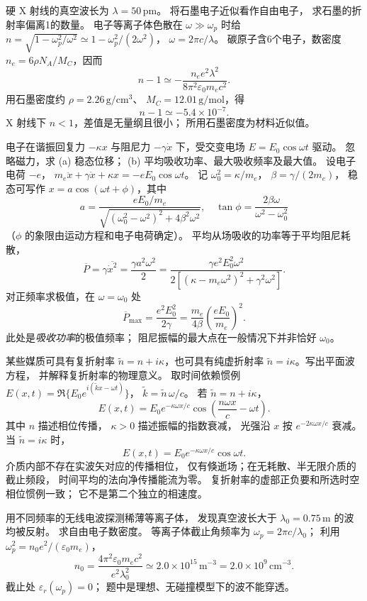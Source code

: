 硬 X 射线的真空波长为 $\lambda=50\,\mathrm{pm}$。
将石墨电子近似看作自由电子，
求石墨的折射率偏离1的数量。
\exsolution
电子等离子体色散在 $\omega\gg\omega_p$ 时给
$n=\sqrt{1-\omega_p^2/\omega^2}
\simeq1-\omega_p^2/(2\omega^2)$，
$\omega=2\pi c/\lambda$。
碳原子含6个电子，数密度
$n_e=6\rho N_A/M_C$，因而
\[
 \boxed{n-1\simeq-
 \frac{n_e e^2\lambda^2}{8\pi^2\varepsilon_0m_ec^2}}.
\]
用石墨密度约
$\rho=2.26\,\mathrm{g/cm^3}$、
$M_C=12.01\,\mathrm{g/mol}$，得
\[
 \boxed{n-1\simeq-5.4\times10^{-7}}.
\]
\excheck X 射线下 $n<1$，差值是无量纲且很小；
所用石墨密度为材料近似值。

电子在谐振回复力 $-\kappa x$ 与阻尼力
$-\gamma\dot x$ 下，受交变电场
$E=E_0\cos\omega t$ 驱动。
忽略磁力，求 (a) 稳态位移；
(b) 平均吸收功率、最大吸收频率及最大值。
\exsolution
设电子电荷 $-e$，
$m_e\ddot x+\gamma\dot x+\kappa x=-eE_0\cos\omega t$。
记 $\omega_0^2=\kappa/m_e$，
$\beta=\gamma/(2m_e)$，
稳态可写作 $x=a\cos(\omega t+\phi)$，其中
\[
 \boxed{a=\frac{eE_0/m_e}
 {\sqrt{(\omega_0^2-\omega^2)^2+4\beta^2\omega^2}}},
 \quad
 \tan\phi=\frac{2\beta\omega}{\omega^2-\omega_0^2}
\]
（$\phi$ 的象限由运动方程和电子电荷确定）。
平均从场吸收的功率等于平均阻尼耗散，
\[
 \overline P=\gamma\overline{\dot x^2}
 =\frac{\gamma a^2\omega^2}{2}
 =\boxed{\frac{\gamma e^2E_0^2\omega^2}
 {2[(\kappa-m_e\omega^2)^2+\gamma^2\omega^2]}}.
\]
对正频率求极值，在 $\omega=\omega_0$ 处
\[
 \boxed{\overline P_{\max}=\frac{e^2E_0^2}{2\gamma}
 =\frac{m_e}{4\beta}\left(\frac{eE_0}{m_e}\right)^2}.
\]
\excheck 此处是\emph{吸收功率}的极值频率；
阻尼振幅的最大点在一般情况下并非恰好 $\omega_0$。

某些媒质可具有复折射率
$\tilde n=n+i\kappa$，也可具有纯虚折射率
$\tilde n=i\kappa$。写出平面波方程，
并解释复折射率的物理意义。
\exsolution
取时间依赖惯例
$E(x,t)=\Re\{E_0e^{i(\tilde kx-\omega t)}\}$，
$\tilde k=\tilde n\,\omega/c$。
若 $\tilde n=n+i\kappa$，
\[
 \boxed{E(x,t)=E_0 e^{-\kappa\omega x/c}
 \cos\left(\frac{n\omega x}{c}-\omega t\right)}.
\]
其中 $n$ 描述相位传播，
$\kappa>0$ 描述振幅的指数衰减，
光强沿 $x$ 按 $e^{-2\kappa\omega x/c}$ 衰减。
当 $\tilde n=i\kappa$ 时，
\[
 \boxed{E(x,t)=E_0e^{-\kappa\omega x/c}\cos\omega t}.
\]
介质内部不存在实波矢对应的传播相位，
仅有倏逝场；在无耗散、半无限介质的截止频段，
时间平均的法向净传播能流为零。
\excheck 复折射率的虚部正负要和所选时空相位惯例一致；
它不是第二个独立的相速度。

用不同频率的无线电波探测稀薄等离子体，
发现真空波长大于
$\lambda_0=0.75\,\mathrm m$ 的波均被反射。
求自由电子数密度。
\exsolution
等离子体截止角频率为
$\omega_p=2\pi c/\lambda_0$；
利用 $\omega_p^2=n_0e^2/(\varepsilon_0m_e)$，
\[
 \boxed{n_0=
 \frac{4\pi^2\varepsilon_0m_ec^2}
 {e^2\lambda_0^2}
 \simeq2.0\times10^{15}\,\mathrm{m^{-3}}
 =2.0\times10^9\,\mathrm{cm^{-3}}}.
\]
\excheck 截止处 $\varepsilon_r(\omega_p)=0$；
题中是理想、无碰撞模型下的波不能穿透。

